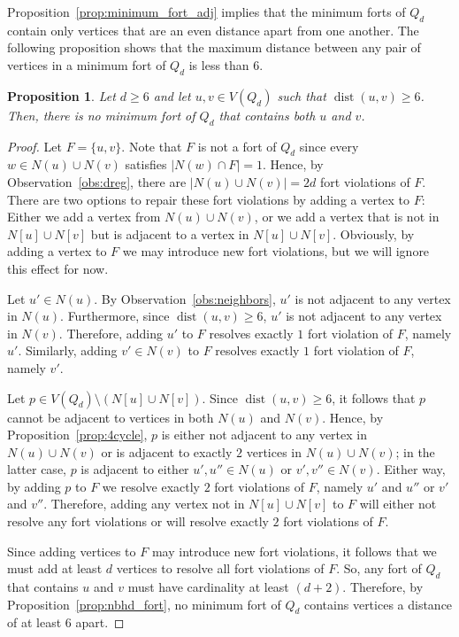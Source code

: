 \documentclass[twoside, 12pt]{article}
\newtheorem{proposition}[theorem]{Proposition}
\theoremstyle{definition}
\newcommand\abs[1]{\left|#1\right|}
\newcommand\dist[2]{\operatorname{dist}\left(#1,#2\right)}
\begin{document}
Proposition~\ref{prop:minimum_fort_adj} implies that the minimum forts of $Q_{d}$ contain only vertices that are an even distance apart from one another. 
The following proposition shows that the maximum distance between any pair of vertices in a minimum fort of $Q_{d}$ is less than $6$. 
\begin{proposition}\label{prop:max_dist6}
Let $d\geq 6$ and let $u,v\in V(Q_{d})$ such that $\dist{u}{v}\geq 6$.
Then, there is no minimum fort of $Q_{d}$ that contains both $u$ and $v$. 
\end{proposition}
\begin{proof}
Let $F=\{u,v\}$.
Note that $F$ is not a fort of $Q_{d}$ since every $w\in N(u)\cup N(v)$ satisfies $\abs{N(w)\cap F}=1$. 
Hence, by Observation~\ref{obs:dreg}, there are $\abs{N(u)\cup N(v)}=2d$ fort violations of $F$.
There are two options to repair these fort violations by adding a vertex to $F$: Either we add a vertex from $N(u)\cup N(v)$, or we add a vertex that is not in $N[u]\cup N[v]$ but is adjacent to a vertex in $N[u]\cup N[v]$.
Obviously, by adding a vertex to $F$ we may introduce new fort violations, but we will ignore this effect for now.

Let $u'\in N(u)$.
By Observation~\ref{obs:neighbors}, $u'$ is not adjacent to any vertex in $N(u)$.
Furthermore, since $\dist{u}{v}\geq 6$, $u'$ is not adjacent to any vertex in $N(v)$. 
Therefore, adding $u'$ to $F$ resolves exactly $1$ fort violation of $F$, namely $u'$. 
Similarly, adding $v'\in N(v)$ to $F$ resolves exactly $1$ fort violation of $F$, namely $v'$. 

Let $p\in V(Q_{d})\setminus\left(N[u]\cup N[v]\right)$. 
Since $\dist{u}{v}\geq 6$, it follows that $p$ cannot be adjacent to vertices in both $N(u)$ and $N(v)$.
Hence, by Proposition~\ref{prop:4cycle}, $p$ is either not adjacent to any vertex in $N(u)\cup N(v)$ or is adjacent to exactly $2$ vertices in $N(u)\cup N(v)$; in the latter case, $p$ is adjacent to either $u',u''\in N(u)$ or $v',v''\in N(v)$. 
Either way, by adding $p$ to $F$ we resolve exactly $2$ fort violations of $F$, namely $u'$ and $u''$ or $v'$ and $v''$. 
Therefore, adding any vertex not in $N[u]\cup N[v]$ to $F$ will either not resolve any fort violations or will resolve exactly $2$ fort violations of $F$.

Since adding vertices to $F$ may introduce new fort violations, it follows that we must add at least $d$ vertices to resolve all fort violations of $F$.
So, any fort of $Q_{d}$ that contains $u$ and $v$ must have cardinality at least $(d+2)$.
Therefore, by Proposition~\ref{prop:nbhd_fort}, no minimum fort of $Q_{d}$ contains vertices a distance of at least $6$ apart.
\end{proof}
\end{document}
